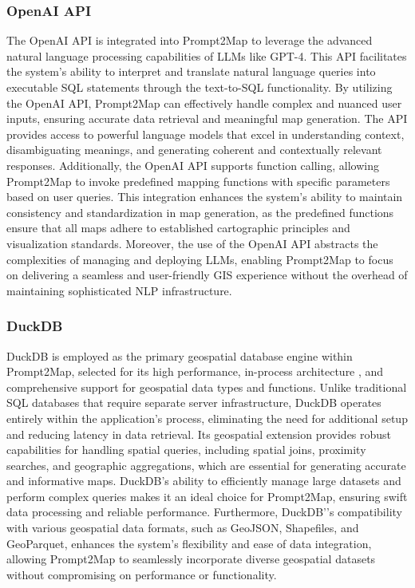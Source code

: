 \subsubsection{OpenAI API}
The OpenAI API is integrated into Prompt2Map to leverage the advanced natural language processing capabilities of LLMs like GPT-4. This API facilitates the system’s ability to interpret and translate natural language queries into executable SQL statements through the text-to-SQL functionality. By utilizing the OpenAI API, Prompt2Map can effectively handle complex and nuanced user inputs, ensuring accurate data retrieval and meaningful map generation. The API provides access to powerful language models that excel in understanding context, disambiguating meanings, and generating coherent and contextually relevant responses. Additionally, the OpenAI API supports function calling, allowing Prompt2Map to invoke predefined mapping functions with specific parameters based on user queries. This integration enhances the system’s ability to maintain consistency and standardization in map generation, as the predefined functions ensure that all maps adhere to established cartographic principles and visualization standards. Moreover, the use of the OpenAI API abstracts the complexities of managing and deploying LLMs, enabling Prompt2Map to focus on delivering a seamless and user-friendly GIS experience without the overhead of maintaining sophisticated NLP infrastructure.


\subsubsection{DuckDB}
DuckDB is employed as the primary geospatial database engine within Prompt2Map, selected for its high performance, in-process architecture \cite{raasveldt_duckdb_2019},  and comprehensive support for geospatial data types and functions. Unlike traditional SQL databases that require separate server infrastructure, DuckDB operates entirely within the application’s process, eliminating the need for additional setup and reducing latency in data retrieval. Its geospatial extension provides robust capabilities for handling spatial queries, including spatial joins, proximity searches, and geographic aggregations, which are essential for generating accurate and informative maps. DuckDB's ability to efficiently manage large datasets and perform complex queries makes it an ideal choice for Prompt2Map, ensuring swift data processing and reliable performance. Furthermore, DuckDB'’s compatibility with various geospatial data formats, such as GeoJSON, Shapefiles, and GeoParquet, enhances the system's flexibility and ease of data integration, allowing Prompt2Map to seamlessly incorporate diverse geospatial datasets without compromising on performance or functionality.


